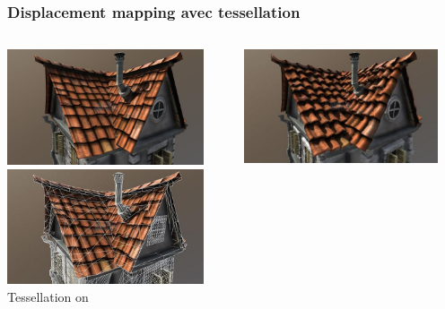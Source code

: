 \documentclass{beamer}
\begin{document}
\begin{frame}
    \frametitle{Displacement mapping avec tessellation}
    \begin{columns}[t]
        \begin{column}{0.5\textwidth}
            \centering
            \includegraphics[width=0.9\textwidth]{images/tesselation_off}\\
            \includegraphics[width=0.9\textwidth]{images/tesselation_off_mesh}\\
            Tessellation on
        \end{column}
        \begin{column}{0.5\textwidth}
            \centering
            \includegraphics[width=0.9\textwidth]{images/tesselation_on}\\

\end{column}
\end{columns}
\end{frame}
\end{document}
